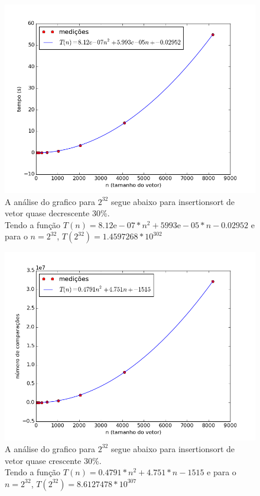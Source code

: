 \documentclass[12pt,a4paper,twoside]{report}
\begin{document}
\clearpage


\begin{figure}[ht]
\centering \includegraphics[scale=0.8]{../insertionsort/imagens/insertionsortQuaseDecresc300.png}
\caption{A análise do grafico para $2^{32}$ segue abaixo para insertionsort de vetor quase decrescente 30\%.\\
Tendo a função $T(n) = 8.12\mathrm{e}-07*n^2+5993\mathrm{e}-05*n-0.02952$ e para o $n =2^{32}$, $T(2^{32}) = 1.4597268 * 10^{302}$}
\label{fig:insertionsortQuaseDecresc300}
\end{figure}

\begin{figure}[ht]
\centering \includegraphics[scale=0.8]{../insertionsort/imagens/insertionsortQuaseDecresc301.png}
\caption{A análise do grafico para $2^{32}$ segue abaixo para insertionsort de vetor quase crescente 30\%.\\
Tendo a função $T(n) = 0.4791*n^2+4.751*n-1515$ e para o $n =2^{32}$, $T(2^{32}) = 8.6127478 * 10^{307}$}
\label{fig:insertionsortQuaseDecresc301}
\end{figure}
\end{document}
